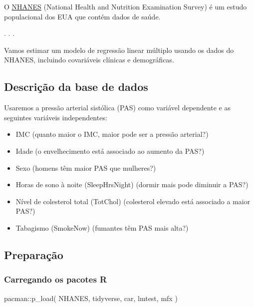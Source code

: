 \documentclass[
  letterpaper,
  DIV=11,
  numbers=noendperiod]{scrartcl}
\newenvironment{Shaded}{\begin{snugshade}}{\end{snugshade}}
\newcommand{\FunctionTok}[1]{\textcolor[rgb]{0.28,0.35,0.67}{#1}}
\newcommand{\NormalTok}[1]{\textcolor[rgb]{0.00,0.23,0.31}{#1}}
\newcommand{\SpecialCharTok}[1]{\textcolor[rgb]{0.37,0.37,0.37}{#1}}
\providecommand{\tightlist}{%
  \setlength{\itemsep}{0pt}\setlength{\parskip}{0pt}}\usepackage{longtable,booktabs,array}
\begin{document}
O \href{https://www.cdc.gov/nchs/nhanes/index.html}{NHANES} (National
Health and Nutrition Examination Survey) é um estudo populacional dos
EUA que contém dados de saúde.

. . .

Vamos estimar um modelo de regressão linear múltiplo usando os dados do
NHANES, incluindo covariáveis clínicas e demográficas.

\subsection{Descrição da base de
dados}\label{descriuxe7uxe3o-da-base-de-dados-1}

Usaremos a pressão arterial sistólica (PAS) como variável dependente e
as seguintes variáveis independentes:

\begin{itemize}
\tightlist
\item
  IMC (quanto maior o IMC, maior pode ser a pressão arterial?)
\item
  Idade (o envelhecimento está associado ao aumento da PAS?)
\item
  Sexo (homens têm maior PAS que mulheres?)
\item
  Horas de sono à noite (SleepHrsNight) (dormir mais pode diminuir a
  PAS?)
\item
  Nível de colesterol total (TotChol) (colesterol elevado está associado
  a maior PAS?)
\item
  Tabagismo (SmokeNow) (fumantes têm PAS mais alta?)
\end{itemize}

\subsection{Preparação}\label{preparauxe7uxe3o}

\subsubsection{Carregando os pacotes R}\label{carregando-os-pacotes-r}

\begin{Shaded}
\begin{Highlighting}[]
\NormalTok{pacman}\SpecialCharTok{::}\FunctionTok{p\_load}\NormalTok{(}
\NormalTok{NHANES,}
\NormalTok{tidyverse,}
\NormalTok{car,}
\NormalTok{lmtest,}
\NormalTok{mfx}
\NormalTok{  ) }
\end{Highlighting}
\end{Shaded}
\end{document}
